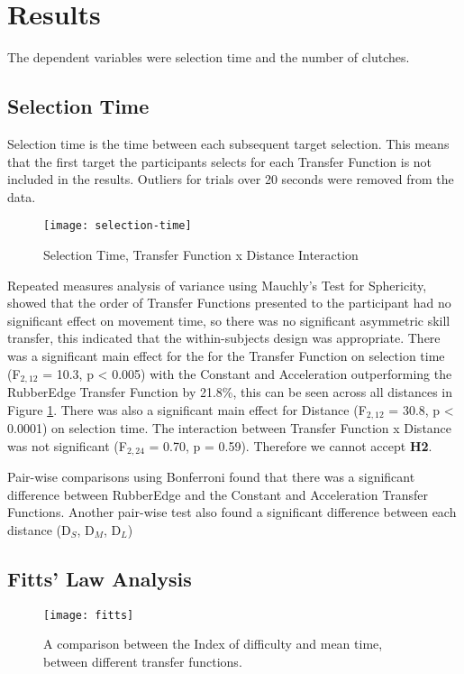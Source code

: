 \section{Results}
The dependent variables were selection time and the number of clutches.

\subsection{Selection Time}
Selection time is the time between each subsequent target selection. This means that the first target the participants selects for each Transfer Function is not included in the results. Outliers for trials over 20 seconds were removed from the data.

\begin{figure}[h]
    \centering
    \texttt{[image: selection-time]}
    \caption{Selection Time, Transfer Function x Distance Interaction}
    \label{fig:selection-time}
\end{figure}

Repeated measures analysis of variance using Mauchly's Test for Sphericity, showed that the order of Transfer Functions presented to the participant had no significant effect on movement time, so there was no significant asymmetric skill transfer, this indicated that the within-subjects design was appropriate. There was a significant main effect for the for the Transfer Function on selection time (F$_{2,12}$ = 10.3, p < 0.005) with the Constant and Acceleration outperforming the RubberEdge Transfer Function by 21.8\%, this can be seen across all distances in Figure \ref{fig:selection-time}. There was also a significant main effect for Distance (F$_{2,12}$ = 30.8, p < 0.0001) on selection time. The interaction between Transfer Function x Distance was not significant (F$_{2,24}$ = 0.70, p = 0.59). Therefore we cannot accept \textbf{H2}.

Pair-wise comparisons using Bonferroni found that there was a significant difference between RubberEdge and the Constant and Acceleration Transfer Functions. Another pair-wise test also found a significant difference between each distance (D$_S$, D$_M$, D$_L$)

\subsection{Fitts' Law Analysis}

\begin{figure}[h]
    \centering
    \texttt{[image: fitts]}
    \caption{A comparison between the Index of difficulty and mean time, between different transfer functions.}
    \label{fig:fitts}
\end{figure}

